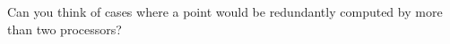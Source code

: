   Can you think of cases where a point would be redundantly computed by
  more than two processors?
